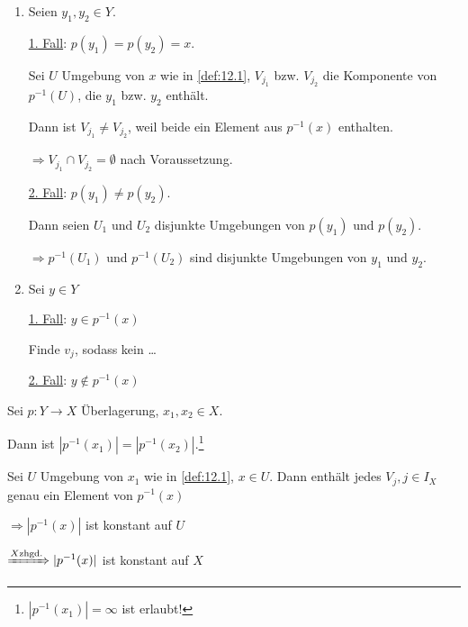 \begin{beweis}\leavevmode
    \begin{enumerate}[label=\alph*)]
        \item Seien $y_1, y_2 \in Y$.

        \underline{1. Fall}: $p(y_1) = p(y_2) = x$.

        Sei $U$ Umgebung von $x$ wie in \cref{def:12.1},
        $V_{j_1}$ bzw. $V_{j_2}$ die Komponente von $p^{-1}(U)$, die
        $y_1$ bzw. $y_2$ enthält.

        Dann ist $V_{j_1} \neq V_{j_2}$, weil beide ein Element aus $p^{-1}(x)$
        enthalten.

        $\Rightarrow V_{j_1} \cap V_{j_2} = \emptyset$ nach Voraussetzung.

        \underline{2. Fall}: $p(y_1) \neq p(y_2)$.
        
        Dann seien $U_1$ und $U_2$ disjunkte Umgebungen von $p(y_1)$
        und $p(y_2)$.

        $\Rightarrow p^{-1}(U_1)$ und $p^{-1}(U_2)$ sind disjunkte 
        Umgebungen von $y_1$ und $y_2$.

        \item Sei $y \in Y$

        \underline{1. Fall}: $y \in p^{-1}(x)$

        Finde $v_j$, sodass kein \dots 

        \underline{2. Fall}: $y \notin p^{-1}(x)$

    \end{enumerate}
\end{beweis}

\begin{bemerkung}\label{kor:12.4}%
    Sei $p: Y \rightarrow X$ Überlagerung, $x_1, x_2 \in X$.

    Dann ist $|p^{-1} (x_1)| = |p^{-1}(x_2)|$.\footnote{$|p^{-1} (x_1)| = \infty$ ist erlaubt!}
\end{bemerkung}

\begin{beweis}
    Sei $U$ Umgebung von $x_1$ wie in \cref{def:12.1}, $x \in U$.
    Dann enthält jedes $V_j, j \in I_X$ genau ein Element von
    $p^{-1}(x)$

    $\Rightarrow |p^{-1} (x)|$ ist konstant auf $U$

    $\xRightarrow{X \text{zhgd.}} |p^{-1}(x)|$  ist konstant auf $X$
\end{beweis}

